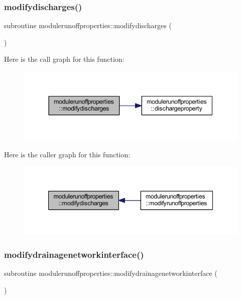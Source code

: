 \subsubsection{\texorpdfstring{modifydischarges()}{modifydischarges()}}
{\footnotesize\ttfamily subroutine modulerunoffproperties\+::modifydischarges (\begin{DoxyParamCaption}{ }\end{DoxyParamCaption})\hspace{0.3cm}{\ttfamily [private]}}

Here is the call graph for this function\+:\nopagebreak
\begin{figure}[H]
\begin{center}
\leavevmode
\includegraphics[width=344pt]{namespacemodulerunoffproperties_a2c08e63707bcb52fb1de5d2a76a15433_cgraph}
\end{center}
\end{figure}
Here is the caller graph for this function\+:\nopagebreak
\begin{figure}[H]
\begin{center}
\leavevmode
\includegraphics[width=347pt]{namespacemodulerunoffproperties_a2c08e63707bcb52fb1de5d2a76a15433_icgraph}
\end{center}
\end{figure}
\mbox{\label{namespacemodulerunoffproperties_af923d884ffbf9570877d94db798722ef}} 
\subsubsection{\texorpdfstring{modifydrainagenetworkinterface()}{modifydrainagenetworkinterface()}}
{\footnotesize\ttfamily subroutine modulerunoffproperties\+::modifydrainagenetworkinterface (\begin{DoxyParamCaption}{ }\end{DoxyParamCaption})\hspace{0.3cm}{\ttfamily [private]}}

